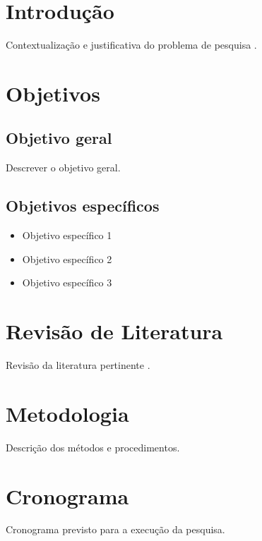 \documentclass{abnt-projeto-pesquisa}
\begin{document}
\imprimircapa
\imprimirfolhaderosto
\imprimirsumario

\chapter{Introdução}

Contextualização e justificativa do problema de pesquisa \cite{eco1977}.

\chapter{Objetivos}

\section{Objetivo geral}

Descrever o objetivo geral.

\section{Objetivos específicos}

\begin{itemize}
  \item Objetivo específico 1
  \item Objetivo específico 2
  \item Objetivo específico 3
\end{itemize}

\chapter{Revisão de Literatura}

Revisão da literatura pertinente \cite{medeiros2019}.

\chapter{Metodologia}

Descrição dos métodos e procedimentos.

\chapter{Cronograma}

Cronograma previsto para a execução da pesquisa.

\printbibliography
\end{document}
